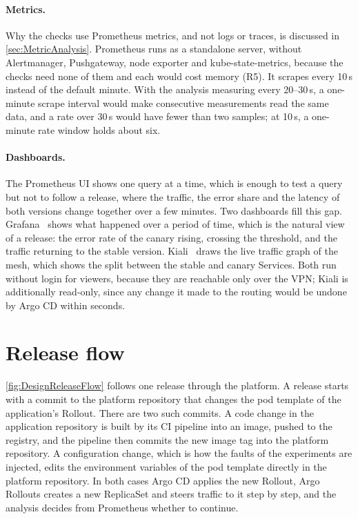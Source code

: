 \paragraph{Metrics.} Why the checks use Prometheus metrics, and not logs or traces, is discussed in \autoref{sec:MetricAnalysis}. Prometheus runs as a standalone server, without Alertmanager, Pushgateway, node exporter and kube-state-metrics, because the checks need none of them and each would cost memory (R5). It scrapes every 10\,s instead of the default minute. With the analysis measuring every 20--30\,s, a one-minute scrape interval would make consecutive measurements read the same data, and a rate over 30\,s would have fewer than two samples; at 10\,s, a one-minute rate window holds about six.

\paragraph{Dashboards.} The Prometheus UI shows one query at a time, which is enough to test a query but not to follow a release, where the traffic, the error share and the latency of both versions change together over a few minutes. Two dashboards fill this gap. Grafana~\cite{Grafana} shows what happened over a period of time, which is the natural view of a release: the error rate of the canary rising, crossing the threshold, and the traffic returning to the stable version. Kiali~\cite{Kiali} draws the live traffic graph of the mesh, which shows the split between the stable and canary Services. Both run without login for viewers, because they are reachable only over the VPN; Kiali is additionally read-only, since any change it made to the routing would be undone by Argo CD within seconds.

\section{Release flow}
\label{sec:DesignReleaseFlow}
\autoref{fig:DesignReleaseFlow} follows one release through the platform. A release starts with a commit to the platform repository that changes the pod template of the application's Rollout. There are two such commits. A code change in the application repository is built by its CI pipeline into an image, pushed to the registry, and the pipeline then commits the new image tag into the platform repository. A configuration change, which is how the faults of the experiments are injected, edits the environment variables of the pod template directly in the platform repository. In both cases Argo CD applies the new Rollout, Argo Rollouts creates a new ReplicaSet and steers traffic to it step by step, and the analysis decides from Prometheus whether to continue.

